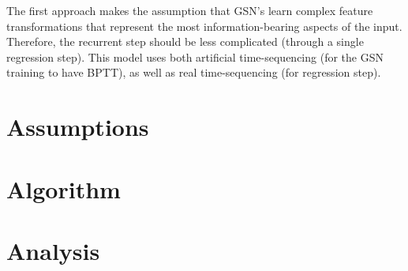 The first approach makes the assumption that GSN's learn complex feature transformations that represent the most information-bearing aspects of the input. Therefore, the recurrent step should be less complicated (through a single regression step). This model uses both artificial time-sequencing (for the GSN training to have BPTT), as well as real time-sequencing (for regression step).

\section{Assumptions}

\section{Algorithm}

\section{Analysis}